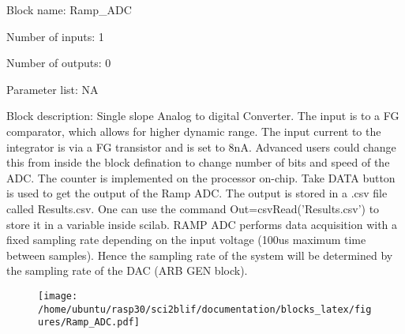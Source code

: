 \pagebreak

Block name: Ramp\_ADC

Number of inputs: 1

Number of outputs: 0

Parameter list: NA

Block description: 
Single slope Analog to digital Converter. The input is to a FG comparator, which allows for higher dynamic range. The input current to the integrator is via a FG transistor and is set to 8nA.
Advanced users could change this from inside the block defination to change number of bits and speed of the ADC. The counter is implemented on the processor on-chip. Take DATA button is used to get the output of the Ramp ADC.
The output is stored in a .csv file called Results.csv. One can use the command Out=csvRead('Results.csv') to store it in a variable inside scilab. RAMP ADC performs data acquisition with a fixed sampling rate depending on the input voltage (100us maximum time between samples).
Hence the sampling rate of the system will be determined by the sampling rate of the DAC (ARB GEN block). 

\begin{figure}[H]  %
\texttt{[image: /home/ubuntu/rasp30/sci2blif/documentation/blocks\_latex/figures/Ramp\_ADC.pdf]}
\end{figure}

